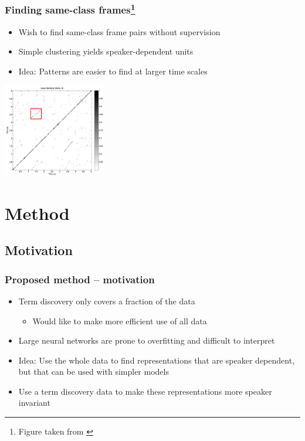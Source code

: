 \documentclass[british]{beamer}
\begin{document}
  \begin{frame}
    \frametitle{Finding same-class frames\footnote{Figure taken from \textcite{jansen2011efficient}}}
    
    \begin{itemize}
     \item Wish to find same-class frame pairs without supervision
     \item Simple clustering yields speaker-dependent units
     \item Idea: Patterns are easier to find at larger time scales
    \end{itemize}
    
    \centering
    \includegraphics[width=4.5cm]{figures/similarity-matrix.png}

  \end{frame}
  
  \section{Method}
  \subsection{Motivation}
  
  \begin{frame}
    \frametitle{Proposed method -- motivation}
    
    \begin{itemize}
     \item Term discovery only covers a fraction of the data
     \begin{itemize}
      \item Would like to make more efficient use of all data
     \end{itemize}
     \item Large neural networks are prone to overfitting and difficult to interpret
     \item Idea: Use the whole data to find representations that are speaker dependent, but that can be used with simpler models
     \item Use a term discovery data to make these representations more speaker invariant
    \end{itemize}
  \end{frame}
  
\end{document}
